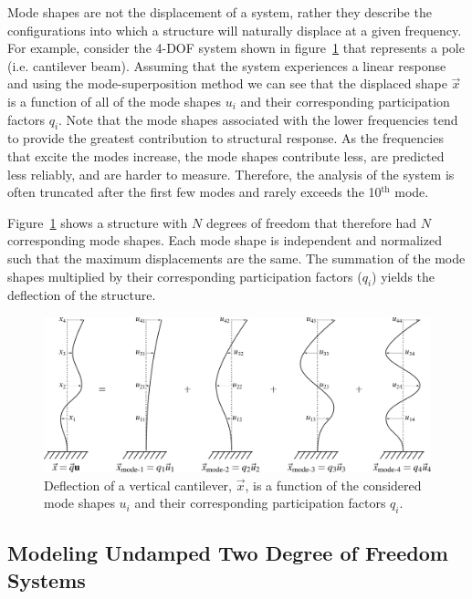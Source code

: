 \documentclass[12pt,letter]{article}
\begin{document}
	
	
	 
	
	Mode shapes are not the displacement of a system, rather they describe the configurations into which a structure will naturally displace at a given frequency. For example, consider the 4-DOF system shown in figure~\ref{fig:general_mode_shapes} that represents a pole (i.e. cantilever beam). Assuming that the system experiences a linear response and using the mode-superposition method we can see that the displaced shape $\vec{x}$ is a function of all of the mode shapes $u_i$ and their corresponding participation factors $q_i$. Note that the mode shapes associated with the lower frequencies tend to provide the greatest contribution to structural response. As the frequencies that excite the modes increase, the mode shapes contribute less, are predicted less reliably, and are harder to measure. Therefore, the analysis of the system is often truncated after the first few modes and rarely exceeds the 10$^{\text{th}}$ mode. 
	
	Figure~\ref{fig:general_mode_shapes} shows a structure with $N$ degrees of freedom that therefore had $N$ corresponding mode shapes. Each mode shape is independent and normalized such that the maximum displacements are the same. The summation of the mode shapes multiplied by their corresponding participation factors ($q_i$) yields the deflection of the structure. 
	
	
	\begin{figure}[H]
		\centering
		\includegraphics[]{../figures/general_mode_shapes.png}
		\caption{Deflection of a vertical cantilever, $\vec{x}$, is a function of the considered mode shapes $u_i$ and their corresponding participation factors $q_i$.}
		\label{fig:general_mode_shapes}
	\end{figure}
	
	
	
	
	
	\subsection{Modeling Undamped Two Degree of Freedom Systems}
	\label{sec:two_degree_of_freedom}
	
\end{document}

